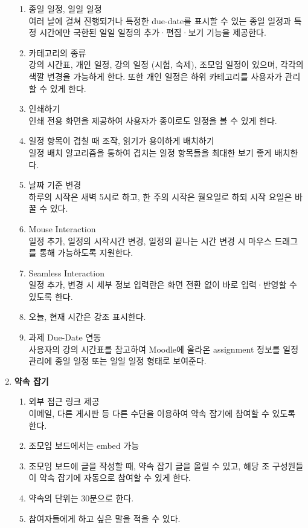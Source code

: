 \documentclass[a4paper,titlepage]{article}
\begin{document}
\begin{enumerate}
\begin{enumerate}
		\item 종일 일정, 일일 일정\\
		여러 날에 걸쳐 진행되거나 특정한 due-date를 표시할 수 있는 종일 일정과 특정 시간에만 국한된 일일 일정의 추가·편집·보기 기능을 제공한다.
		\item 카테고리의 종류\\
		강의 시간표, 개인 일정, 강의 일정 (시험, 숙제), 조모임 일정이 있으며, 각각의 색깔 변경을 가능하게 한다. 또한 개인 일정은 하위 카테고리를 사용자가 관리할 수 있게 한다.
		\item 인쇄하기\\
		인쇄 전용 화면을 제공하여 사용자가 종이로도 일정을 볼 수 있게 한다.
		\item 일정 항목이 겹칠 때 조작, 읽기가 용이하게 배치하기\\
		일정 배치 알고리즘을 통하여 겹치는 일정 항목들을 최대한 보기 좋게 배치한다.
		\item 날짜 기준 변경\\
		하루의 시작은 새벽 5시로 하고, 한 주의 시작은 월요일로 하되 시작 요일은 바꿀 수 있다.
		\item Mouse Interaction\\
		일정 추가, 일정의 시작시간 변경, 일정의 끝나는 시간 변경 시 마우스 드래그를 통해 가능하도록 지원한다.
		\item Seamless Interaction\\
		일정 추가, 변경 시 세부 정보 입력란은 화면 전환 없이 바로 입력·반영할 수 있도록 한다.
		\item 오늘, 현재 시간은 강조 표시한다.
		\item 과제 Due-Date 연동\\
		사용자의 강의 시간표를 참고하여 Moodle에 올라온 assignment 정보를 일정관리에 종일 일정 또는 일일 일정 형태로 보여준다. 
	\end{enumerate}
	\item\textbf{약속 잡기}
	\begin{enumerate}
		\item 외부 접근 링크 제공\\
		이메일, 다른 게시판 등 다른 수단을 이용하여 약속 잡기에 참여할 수 있도록 한다.
		\item 조모임 보드에서는 embed 가능
		\item 조모임 보드에 글을 작성할 때, 약속 잡기 글을 올릴 수 있고, 해당 조 구성원들이 약속 잡기에 자동으로 참여할 수 있게 한다.
		\item 약속의 단위는 30분으로 한다.
		\item 참여자들에게 하고 싶은 말을 적을 수 있다.

\end{enumerate}
\end{enumerate}
\end{document}
